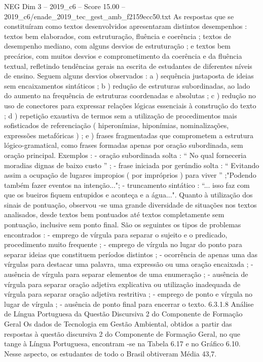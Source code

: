 \begin{textsample}{NEG Dim 3 – 2019\_c6 – Score 15.00 – 2019\_c6/enade\_2019\_tec\_gest\_amb\_f2159ecc50.txt}
As respostas que se constituíram como textos desenvolvidos apresentaram distintos desempenhos : textos bem elaborados, com estruturação, fluência e coerência ; textos de desempenho mediano, com alguns desvios de estruturação ; e textos bem precários, com muitos desvios e comprometimento da coerência e da fluência textual, refletindo tendências gerais na escrita de estudantes de diferentes níveis de ensino.
Seguem alguns desvios observados : a ) sequência justaposta de ideias sem encaixamentos sintáticos ; b ) redução de estruturas subordinadas, ao lado do aumento na frequência de estruturas coordenadas e absolutas ; c ) redução no uso de conectores para expressar relações lógicas essenciais à construção do texto ; d ) repetição exaustiva de termos sem a utilização de procedimentos mais sofisticados de referenciação ( hiperonímias, hiponímias, nominalizações, expressões metafóricas ) ; e ) frases fragmentadas que comprometem a estrutura lógico-gramatical, como frases formadas apenas por oração subordinada, sem oração principal.
Exemplos : - oração subordinada solta : “ No qual forneceria moradias dignas de baixo custo ” ; - frase iniciada por gerúndio solta : “ Evitando assim a ocupação de lugares impropios ( por impróprios ) para viver ” ;"Podendo também fazer eventos na intenção..."; - truncamento sintático : “... isso faz com que os bueiros fiquem entupidos e aconteça e a água...".
Quanto à utilização dos sinais de pontuação, observou -se uma grande diversidade de situações nos textos analisados, desde textos bem pontuados até textos completamente sem pontuação, inclusive sem ponto final.
São os seguintes os tipos de problemas encontrados : - emprego de vírgula para separar o sujeito e o predicado, procedimento muito frequente ; - emprego de vírgula no lugar do ponto para separar ideias que constituem períodos distintos ; - ocorrência de apenas uma das vírgulas para destacar uma palavra, uma expressão ou uma oração encaixada ; - ausência de vírgula para separar elementos de uma enumeração ; - ausência de vírgula para separar oração adjetiva explicativa ou utilização inadequada de vírgula para separar oração adjetiva restritiva ; - emprego de ponto e vírgula no lugar de vírgula ; - ausência de ponto final para encerrar o texto. 6.3.1.8 Análise de Língua Portuguesa da Questão Discursiva 2 do Componente de Formação Geral Os dados de Tecnologia em Gestão Ambiental, obtidos a partir das respostas à questão discursiva 2 do Componente de Formação Geral, no que tange à Língua Portuguesa, encontram -se na Tabela 6.17 e no Gráfico 6.10.
Nesse aspecto, os estudantes de todo o Brasil obtiveram Média 43,7.

\end{textsample}
